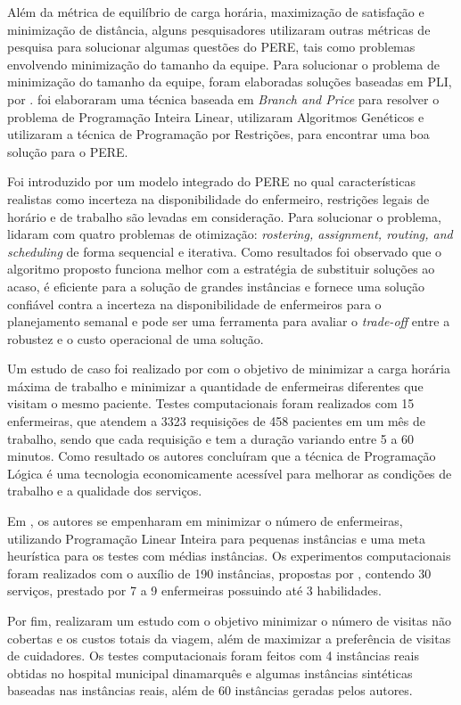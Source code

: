 Além da métrica de equilíbrio de carga horária, maximização de satisfação e minimização de distância, alguns pesquisadores utilizaram outras métricas de pesquisa para solucionar algumas questões do \ac{PERE}, tais como problemas envolvendo minimização do tamanho da equipe. Para solucionar o problema de minimização do tamanho da equipe, foram elaboradas soluções baseadas em \acl{PLI}, por .  foi elaboraram uma técnica baseada em \textit{Branch and Price} para resolver o problema de Programação Inteira Linear,  utilizaram Algoritmos Genéticos e  utilizaram a técnica de Programação por Restrições, para encontrar uma boa solução para o \ac{PERE}.

Foi introduzido por  um modelo integrado do \ac{PERE} no qual características realistas como incerteza na disponibilidade do enfermeiro, restrições legais de horário e de trabalho são levadas em consideração.
Para solucionar o problema,  lidaram com quatro problemas de otimização: \textit{rostering, assignment, routing, and scheduling} de forma sequencial e iterativa. 
Como resultados foi observado que o algoritmo proposto funciona melhor com a estratégia de substituir soluções ao acaso, é eficiente para a solução de grandes instâncias e fornece uma solução confiável contra a incerteza na disponibilidade de enfermeiros para o planejamento semanal e pode ser uma ferramenta para avaliar o \textit{trade-off} entre a robustez e o custo operacional de uma solução.

Um estudo de caso foi realizado por  com o objetivo de minimizar a carga horária máxima de trabalho e minimizar a quantidade de enfermeiras diferentes que visitam o mesmo paciente. Testes computacionais foram realizados com 15 enfermeiras, que atendem a 3323 requisições de 458 pacientes em um mês de trabalho, sendo que cada requisição e tem a duração variando entre 5 a 60 minutos. 
Como resultado os autores concluíram que a técnica de Programação Lógica é uma tecnologia economicamente acessível para melhorar as condições de trabalho e a qualidade dos serviços.

Em , os autores se empenharam em minimizar o número de enfermeiras, utilizando Programação Linear Inteira para pequenas instâncias e uma meta heurística para os testes com médias instâncias. 
Os experimentos computacionais foram realizados com o auxílio de 190 instâncias, propostas por , contendo 30 serviços, prestado por 7 a 9 enfermeiras possuindo até 3 habilidades. 

Por fim,  realizaram um estudo com o objetivo minimizar o número de visitas não cobertas e os custos totais da viagem, além de maximizar a preferência de visitas de cuidadores.
Os testes computacionais foram feitos com 4 instâncias reais obtidas no hospital municipal dinamarquês e algumas instâncias sintéticas baseadas nas instâncias reais, além de 60 instâncias geradas pelos autores.



